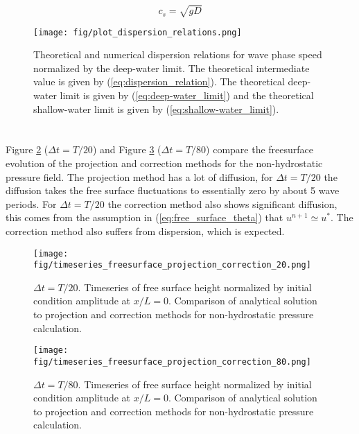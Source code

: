 \documentclass[12pt]{article}
\begin{document}
\begin{equation} \label{eq:shallow-water_limit}
c_s = \sqrt{gD}
\end{equation}

	\begin{figure}[htb]
		\begin{center}
			\texttt{[image: fig/plot\_dispersion\_relations.png]}
			\caption{Theoretical and numerical dispersion relations for wave phase speed normalized by the deep-water limit. The theoretical intermediate value is given by (\ref{eq:dispersion_relation}). The theoretical deep-water limit is given by (\ref{eq:deep-water_limit}) and the theoretical shallow-water limit is given by (\ref{eq:shallow-water_limit}).}
			\label{fig:plot_dispersion_relations}
		\end{center}
	\end{figure}

\section{}

Figure \ref{fig:timeseries_freesurface_projection_correction_20} ($\Delta t = T/20$) and Figure \ref{fig:timeseries_freesurface_projection_correction_80} ($\Delta t = T/80$) compare the freesurface evolution of the projection and correction methods for the non-hydrostatic pressure field. The projection method has a lot of diffusion, for $\Delta t = T/20$ the diffusion takes the free surface fluctuations to essentially zero by about 5 wave periods. For $\Delta t = T/20$ the correction method also shows significant diffusion, this comes from the assumption in (\ref{eq:free_surface_theta}) that $u^{n+1} \simeq u^*$. The correction method also suffers from dispersion, which is expected.

	\begin{figure}[htb]
		\begin{center}
			\texttt{[image: fig/timeseries\_freesurface\_projection\_correction\_20.png]}
			\caption{$\Delta t = T/20$. Timeseries of free surface height normalized by initial condition amplitude at $x/L=0$. Comparison of analytical solution to projection and correction methods for non-hydrostatic pressure calculation.}
			\label{fig:timeseries_freesurface_projection_correction_20}
		\end{center}
	\end{figure}
	
	\begin{figure}[htb]
		\begin{center}
			\texttt{[image: fig/timeseries\_freesurface\_projection\_correction\_80.png]}
			\caption{$\Delta t = T/80$. Timeseries of free surface height normalized by initial condition amplitude at $x/L=0$. Comparison of analytical solution to projection and correction methods for non-hydrostatic pressure calculation.}
			\label{fig:timeseries_freesurface_projection_correction_80}
		\end{center}
	\end{figure}
	
\end{document}

